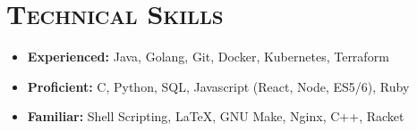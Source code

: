 \documentclass{article}
\begin{document}
\section*{\textsc{Technical Skills}}
\begin{itemize}[label={},leftmargin=*]
  \item \textbf{Experienced:} Java, Golang, Git, Docker, Kubernetes, Terraform
  \item \textbf{Proficient:} C, Python, SQL, Javascript (React, Node, ES5/6), Ruby
  \item \textbf{Familiar:} Shell Scripting, LaTeX, GNU Make, Nginx, C++, Racket
\end{itemize}
\end{document}
